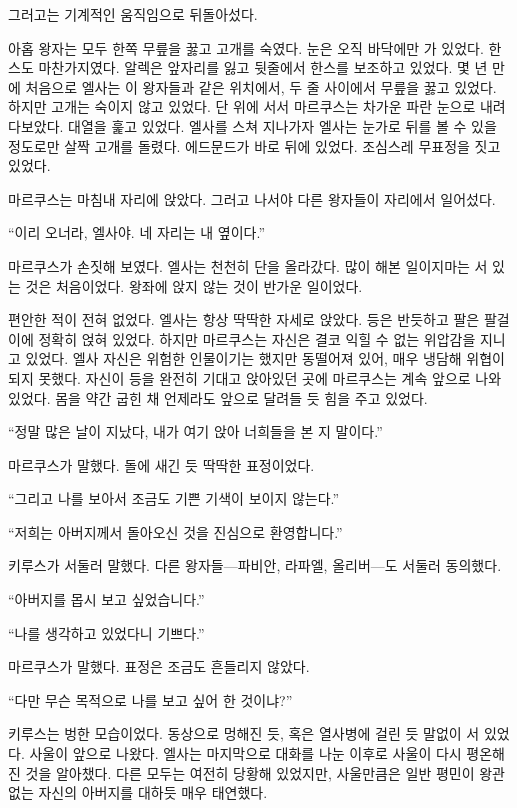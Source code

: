 그러고는 기계적인 움직임으로 뒤돌아섰다.

아홉 왕자는 모두 한쪽 무릎을 꿇고 고개를 숙였다. 눈은 오직 바닥에만 가 있었다. 한스도 마찬가지였다. 알렉은 앞자리를 잃고 뒷줄에서 한스를 보조하고 있었다. 몇 년 만에 처음으로 엘사는 이 왕자들과 같은 위치에서, 두 줄 사이에서 무릎을 꿇고 있었다. 하지만 고개는 숙이지 않고 있었다. 단 위에 서서 마르쿠스는 차가운 파란 눈으로 내려다보았다. 대열을 훑고 있었다. 엘사를 스쳐 지나가자 엘사는 눈가로 뒤를 볼 수 있을 정도로만 살짝 고개를 돌렸다. 에드문드가 바로 뒤에 있었다. 조심스레 무표정을 짓고 있었다.

마르쿠스는 마침내 자리에 앉았다. 그러고 나서야 다른 왕자들이 자리에서 일어섰다.

``이리 오너라, 엘사야. 네 자리는 내 옆이다.''

마르쿠스가 손짓해 보였다. 엘사는 천천히 단을 올라갔다. 많이 해본 일이지마는 서 있는 것은 처음이었다. 왕좌에 앉지 않는 것이 반가운 일이었다.

편안한 적이 전혀 없었다. 엘사는 항상 딱딱한 자세로 앉았다. 등은 반듯하고 팔은 팔걸이에 정확히 얹혀 있었다. 하지만 마르쿠스는 자신은 결코 익힐 수 없는 위압감을 지니고 있었다. 엘사 자신은 위험한 인물이기는 했지만 동떨어져 있어, 매우 냉담해 위협이 되지 못했다. 자신이 등을 완전히 기대고 앉아있던 곳에 마르쿠스는 계속 앞으로 나와 있었다. 몸을 약간 굽힌 채 언제라도 앞으로 달려들 듯 힘을 주고 있었다.

``정말 많은 날이 지났다, 내가 여기 앉아 너희들을 본 지 말이다.''

마르쿠스가 말했다. 돌에 새긴 듯 딱딱한 표정이었다.

``그리고 나를 보아서 조금도 기쁜 기색이 보이지 않는다.''

``저희는 아버지께서 돌아오신 것을 진심으로 환영합니다.''

키루스가 서둘러 말했다. 다른 왕자들—파비안, 라파엘, 올리버—도 서둘러 동의했다.

``아버지를 몹시 보고 싶었습니다.''

``나를 생각하고 있었다니 기쁘다.''

마르쿠스가 말했다. 표정은 조금도 흔들리지 않았다.

``다만 무슨 목적으로 나를 보고 싶어 한 것이냐?''

키루스는 벙한 모습이었다. 동상으로 멍해진 듯, 혹은 열사병에 걸린 듯 말없이 서 있었다. 사울이 앞으로 나왔다. 엘사는 마지막으로 대화를 나눈 이후로 사울이 다시 평온해진 것을 알아챘다. 다른 모두는 여전히 당황해 있었지만, 사울만큼은 일반 평민이 왕관 없는 자신의 아버지를 대하듯 매우 태연했다.

